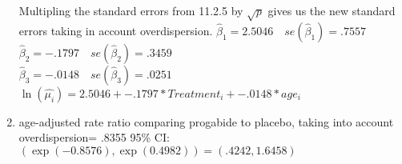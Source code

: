 \documentclass{article}
\newcommand{\hb}{\hat{\beta}}
\begin{document}
\begin{flushleft}
\begin{enumerate}
Multipling the standard errors from 11.2.5 by $\sqrt{p}$ gives us the new standard errors taking in account overdispersion.
$\hb_1=2.5046 \quad se(\hb_1)=.7557$\\
$\hb_2=-.1797 \quad se(\hb_2)=.3459$\\
$\hb_3=-.0148 \quad se(\hb_3)=.0251$\medbreak
$\ln(\hat{\mu_i})=2.5046+-.1797*Treatment_i+-.0148*age_i$ \medbreak
\item
age-adjusted rate ratio comparing progabide to placebo, taking into account overdispersion= .8355
95\% CI: $(\exp(-0.8576),\exp(0.4982))=(.4242,1.6458)$\medbreak
\end{enumerate}

\end{flushleft}
\end{document}
